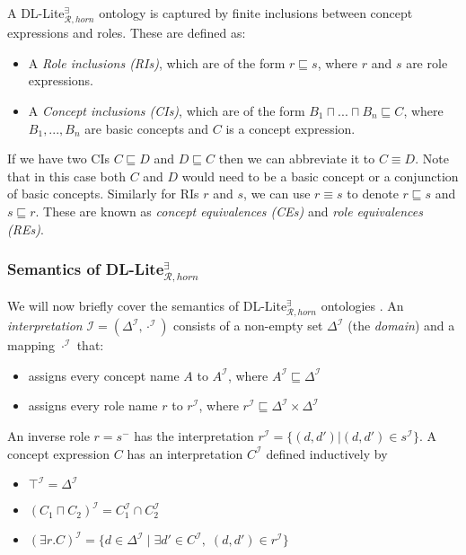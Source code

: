 A DL-Lite$_{\mathcal{R}, horn}^{\exists}$ ontology is captured by finite inclusions between concept expressions and roles. These are defined as: 
\begin{itemize}
    \setlength\itemsep{1em}
    \item A \emph{Role inclusions (RIs)}, which are of the form $r\sqsubseteq s$, where $r$ and $s$ are role expressions.
    \item A \emph{Concept inclusions (CIs)}, which are of the form $B_1 \sqcap ... \sqcap B_n \sqsubseteq C$, where $B_1, ..., B_n$ are basic concepts and $C$ is a concept expression.
\end{itemize}

If we have two CIs $C\sqsubseteq D$ and $D \sqsubseteq C$ then we can abbreviate it to $C \equiv D$. Note that in this case both $C$ and $D$ would need to be a basic concept or a conjunction of basic concepts. Similarly for RIs $r$ and $s$, we can use $r\equiv s$ to denote $r\sqsubseteq s$ and $s \sqsubseteq r$. These are known as \emph{concept equivalences (CEs)} and \emph{role equivalences (REs)}.

\subsubsection{Semantics of DL-Lite$_{\mathcal{R}, horn}^{\exists}$}
We will now briefly cover the semantics of DL-Lite$_{\mathcal{R}, horn}^{\exists}$ ontologies \cite{baader_horrocks_lutz_sattler_2017}. An \emph{interpretation} $\mathcal{I} = (\Delta^{\mathcal{I}}, \cdot^{\mathcal{I}})$ consists of a non-empty set $\Delta^{\mathcal{I}}$ (the \emph{domain}) and a mapping $\cdot^{\mathcal{I}}$ that:
\begin{itemize}
    \item assigns every concept name $A$ to $A^{\mathcal{I}}$, where $A^{\mathcal{I}}\sqsubseteq \Delta^{\mathcal{I}}$
    \item assigns every role name $r$ to  $r^{\mathcal{I}}$, where $r^{\mathcal{I}}\sqsubseteq \Delta^{\mathcal{I}}\times \Delta^{\mathcal{I}}$
\end{itemize}
An inverse role $r = s^-$ has the interpretation $r^{\mathcal{I}}=\{(d, d') | (d,d')\in s^{\mathcal{I}}\}$. A concept expression $C$ has an interpretation $C^{\mathcal{I}}$ defined inductively by
\begin{itemize}
    \item $ \top^{\mathcal{I}} = \Delta^{\mathcal{I}} $
    \item $ (C_{1} \sqcap C_{2})^{\mathcal{I}} = C_{1}^{\mathcal{I}} \cap C_{2}^{\mathcal{I}} $
    \item $ (\exists r.C)^{\mathcal{I}} = \{d\in \Delta ^{\mathcal{I}}\;|\; \exists d' \in C^{\mathcal{I}}, \; (d,d')\in r^{\mathcal{I}}\} $
\end{itemize}

